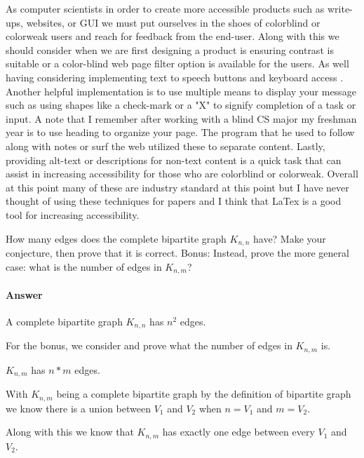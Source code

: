 \documentclass{article}
\begin{document}
As computer scientists in order to create more accessible products such as write-ups, websites, or GUI
we must put ourselves in the shoes of colorblind or colorweak users and reach for feedback from the end-user.
Along with this we should consider when we are first designing a product is ensuring
contrast is suitable or a color-blind web page filter option is available for
the users. As well having considering implementing text to speech buttons and keyboard access
. Another helpful implementation is to use multiple means to display your message such as using
shapes like a check-mark or a "X" to signify completion of a task or input. A
note that I remember after working with a blind CS major my freshman year is to
use heading to organize your page. The program that he used to follow along with
notes or surf the web utilized these to separate content. Lastly, providing alt-text
or descriptions for non-text content is a quick task that can assist in increasing
accessibility for those who are colorblind or colorweak. Overall at this point
many of these are industry standard at this point but I have never thought of using
these techniques for papers and I think that LaTex is a good tool for increasing
accessibility.




 

How many edges does the complete bipartite graph $K_{n,n}$ have?  Make your
conjecture, then prove that it is correct.
Bonus: Instead, prove the more general case:
what is the number of edges in $K_{n,m}$?

\paragraph{Answer}

A complete bipartite graph $K_{n,n}$ has $n^2$ edges.

For the bonus, we consider and prove what the number of edges in $K_{n,m}$ is.

$K_{n,m}$ has $n*m$ edges.

With $K_{n,m}$ being a complete bipartite graph by the definition of bipartite graph
we know there is a union between $V_1$ and $V_2$ when $n=V_1$ and $m=V_2$.

Along with this we know that $K_{n,m}$ has exactly one edge between every
$V_1$ and $V_2$.
\end{document}
